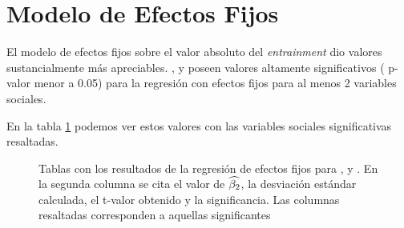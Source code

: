 \section{Modelo de Efectos Fijos}

\newcommand{\slopeestim}[1] { $\estslope \sim #1$ }

El modelo de efectos fijos sobre el valor absoluto del \emph{entrainment} dio valores sustancialmente más apreciables. \ENGMAX, \FOMEAN y \NOISETOHARMONICS poseen valores altamente significativos ( p-valor menor a 0.05) para la regresión con efectos fijos para al menos 2 variables sociales.

En la tabla \ref{regresion_efectos_fijos_tabla} podemos ver estos valores con las variables sociales significativas resaltadas.


\begin{figure}

\caption{Tablas con los resultados de la regresión de efectos fijos para \ENGMAX, \FOMEAN y \NOISETOHARMONICS. En la segunda columna se cita el valor de $\widehat{\beta_2}$, la desviación estándar calculada, el t-valor obtenido y la significancia. Las columnas resaltadas corresponden a aquellas significantes}\label{regresion_efectos_fijos_tabla}
\end{figure}
